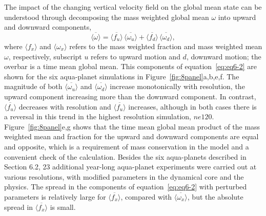 The impact of the changing vertical velocity field on the global mean state can be understood through decomposing the mass weighted global mean $\omega$ into upward and downward components,
\begin{equation}
\overline{\langle \omega \rangle} = \overline{\langle f_{u} \rangle} \, \overline{\langle \omega_{u} \rangle} + \overline{\langle f_{d} \rangle} \, \overline{\langle \omega_{d} \rangle}, \label{eq:eq6-2}
\end{equation}
where $\langle f_x \rangle$ and $\langle \omega_x \rangle$ refers to the mass weighted fraction and mass weighted mean $\omega$, respectively, subscript $u$ refers to upward motion and $d$, downward motion; the overbar is a time mean global mean. This components of equation~\ref{eq:eq6-2} are shown for the six aqua-planet simulations in Figure~\ref{fig:8panel}a,b,e,f. The magnitude of both $\overline{\langle \omega_{u} \rangle}$ and $\overline{\langle \omega_{d} \rangle}$ increase monotonically with resolution, the upward component increasing more than the downward component. In contrast, $\overline{\langle f_{u} \rangle}$ decreases with resolution and $\overline{\langle f_{u} \rangle}$ increases, although in both cases there is a reversal in this trend in the highest resolution simulation, $ne120$. Figure~\ref{fig:8panel}e,g shows that the time mean global mean product of the mass weighted mean and fraction for the upward and downward components are equal and opposite, which is a requirement of mass conservation in the model and a convenient check of the calculation. Besides the six aqua-planets described in Section 6.2, 23 additional year-long aqua-planet experiments were carried out at various resolutions, with modified parameters in the dynamical core and the physics. The spread in the components of equation~\ref{eq:eq6-2} with perturbed parameters is relatively large for $\overline{\langle f_{x} \rangle}$, compared with $\overline{\langle \omega_{x} \rangle}$, but the absolute spread in $\overline{\langle f_{x} \rangle}$ is small.

